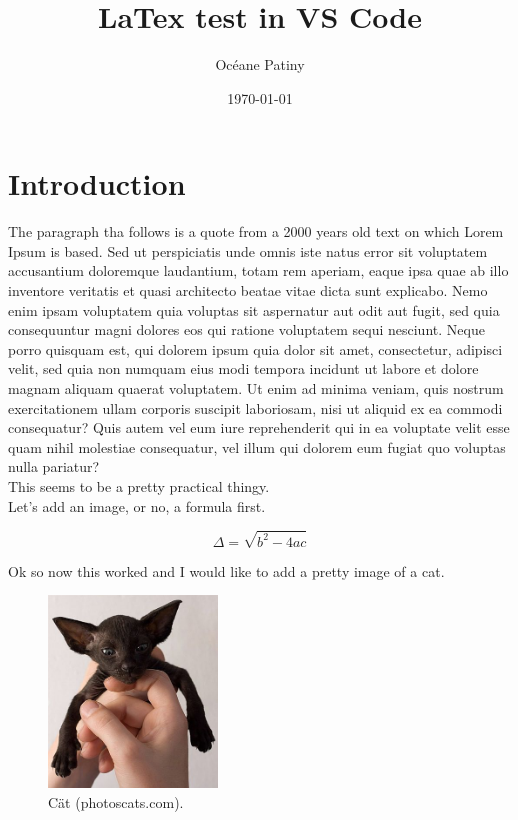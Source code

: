 \documentclass[a4paper,10pt]{article}
\title{LaTex test in VS Code}
\author{Océane Patiny}
\date{\today}
\begin{document}
\maketitle

\section*{Introduction}

The paragraph tha follows is a quote from a 2000 years old text on which Lorem Ipsum is based.
Sed ut perspiciatis unde omnis iste natus error sit voluptatem accusantium doloremque laudantium, totam rem aperiam, eaque ipsa quae ab illo inventore veritatis et quasi architecto beatae vitae dicta sunt explicabo. Nemo enim ipsam voluptatem quia voluptas sit aspernatur aut odit aut fugit, sed quia consequuntur magni dolores eos qui ratione voluptatem sequi nesciunt. Neque porro quisquam est, qui dolorem ipsum quia dolor sit amet, consectetur, adipisci velit, sed quia non numquam eius modi tempora incidunt ut labore et dolore magnam aliquam quaerat voluptatem. Ut enim ad minima veniam, quis nostrum exercitationem ullam corporis suscipit laboriosam, nisi ut aliquid ex ea commodi consequatur? Quis autem vel eum iure reprehenderit qui in ea voluptate velit esse quam nihil molestiae consequatur, vel illum qui dolorem eum fugiat quo voluptas nulla pariatur?\\

This seems to be a pretty practical thingy.\\

Let's add an image, or no, a formula first.

\begin{equation}
    \Delta = \sqrt{b^2 - 4ac}
\end{equation}

Ok so now this worked and I would like to add a pretty image of a cat.


\begin{figure}[H]
    \centering
    \includegraphics[width = 0.4\textwidth]{sphinx.jpg}
    \caption{Cät (photoscats.com).}
    \label{fig:scheme1}
\end{figure}



\label{Lastpage}
\end{document}
